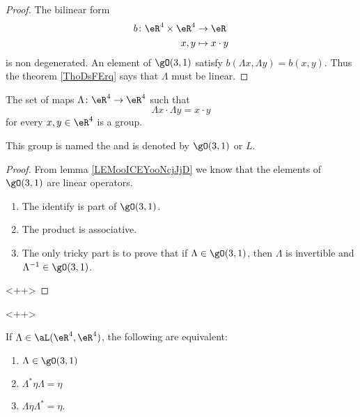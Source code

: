 \begin{proof}
    The bilinear form
    \begin{equation}
        \begin{aligned}
            b\colon \eR^4\times \eR^4&\to \eR \\
            x,y&\mapsto x\cdot y 
        \end{aligned}
    \end{equation}
    is non degenerated. An element of \( \gO(3,1)\) satisfy \( b(\Lambda x,\Lambda y)=b(x,y)\). Thus the theorem \ref{ThoDsFErq} says that \( \Lambda\) must be linear.
\end{proof}

\begin{lemmaDef}
    The set of maps \( \Lambda\colon \eR^4\to \eR^4\) such that
    \begin{equation}
        \Lambda x\cdot \Lambda y=x\cdot y
    \end{equation}
    for every \( x,y\in  \eR^4\) is a group.

    This group is named the  and is denoted by \( \gO(3,1)\) or \( L\).
\end{lemmaDef}

\begin{proof}
    From lemma \ref{LEMooICEYooNcjJjD} we know that the elements of \( \gO(3,1)\) are linear operators.
    \begin{enumerate}
        \item
            The identify is part of \( \gO(3,1)\).
        \item
            The product is associative.
        \item
            The only tricky part is to prove that if \( \Lambda\in \gO(3,1)\), then \( \Lambda\) is invertible and \( \Lambda^{-1}\in \gO(3,1)\).
    \end{enumerate}
    <++>
\end{proof}
<++>

\begin{lemma}       \label{LEMooDLWDooWCXlWq}
    If \( \Lambda\in \aL(\eR^4,\eR^4)\), the following are equivalent:
            \begin{enumerate}
                \item \( \Lambda\in\gO(3,1)\)
                \item \( \Lambda^*\eta\Lambda=\eta\)
                \item \( \Lambda\eta\Lambda^*=\eta\).
            \end{enumerate}
\end{lemma}

